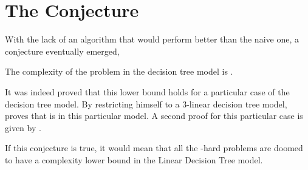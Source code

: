 \section{The Conjecture}

With the lack of an algorithm that would perform better than the naive
 one, a conjecture eventually emerged,

\begin{conjecture}
The complexity of the \threeSUM problem in the decision tree model is
.
\end{conjecture}

It was indeed proved that this lower bound holds for a particular case of the
decision tree model. By restricting himself to a $3$-linear decision tree
model, \citet{erickson:1999} proves that \threeSUM is  in this
particular model. A second proof for this particular case is given by
\citet{ailon:2005}.

If this conjecture is true, it would mean that all the \threeSUM-hard
problems are doomed to have a  complexity lower bound in the
Linear Decision Tree model.
